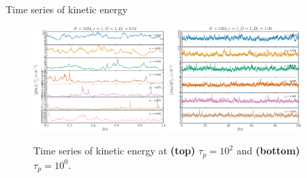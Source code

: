 \documentclass{beamer}
\begin{document}
\begin{frame}{Time series of kinetic energy}

\begin{figure}
\centering
\includegraphics[width=0.45\textwidth]{No1024_Fl1000_Vl0000_Tl1000_Rj1000.ecC.eps}
\includegraphics[width=0.45\textwidth]{No1024_Fl1000_Vl0000_Tl1000_Rl1000.ecC.eps}
\caption{Time series of kinetic energy at {\bf (top)} $\tau_p = 10^2$ and {\bf (bottom)} $\tau_p = 10^0$.}
\end{figure}


\end{frame}
\end{document}
